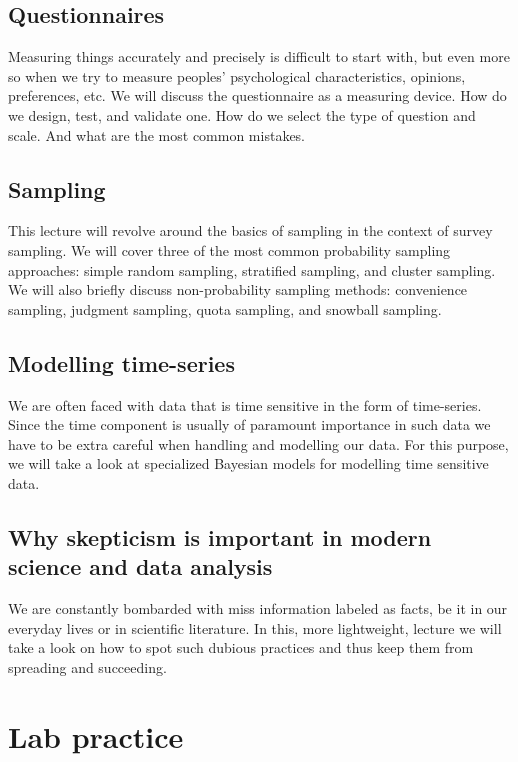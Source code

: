\documentclass[fleqn,moreauthors,10pt]{ds_report}
\begin{document}
\subsection*{Questionnaires}

Measuring things accurately and precisely is difficult to start with, but even more so when we try to measure peoples' psychological characteristics, opinions, preferences, etc. We will discuss the questionnaire as a measuring device. How do we design, test, and validate one. How do we select the type of question and scale. And what are the most common mistakes.

\subsection*{Sampling}

This lecture will revolve around the basics of sampling in the context of survey sampling. We will cover three of the most common probability sampling approaches: simple random sampling, stratified sampling, and cluster sampling. We will also briefly discuss non-probability sampling methods: convenience sampling, judgment sampling, quota sampling, and snowball sampling.

\subsection*{Modelling time-series}

We are often faced with data that is time sensitive in the form of time-series. Since the time component is usually of paramount importance in such data we have to be extra careful when handling and modelling our data. For this purpose, we will take a look at specialized Bayesian models for modelling time sensitive data.

\subsection*{Why skepticism is important in modern science and data analysis}

We are constantly bombarded with miss information labeled as facts, be it in our everyday lives or in scientific literature. In this, more lightweight, lecture we will take a look on how to spot such dubious practices and thus keep them from spreading and succeeding.

\section*{Lab practice}
\end{document}
